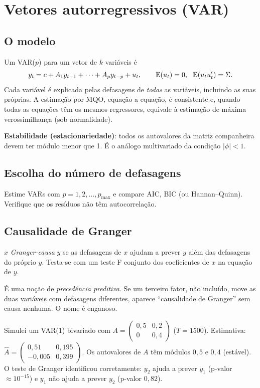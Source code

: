 \chapter{Vetores autorregressivos (VAR)}
\label{cap:var}

\section{O modelo}
Um VAR($p$) para um vetor de $k$ variáveis é
\[
y_t=c+A_1y_{t-1}+\dots+A_py_{t-p}+u_t,\qquad \mathbb{E}(u_t)=0,\ \ \mathbb{E}(u_tu_t')=\Sigma.
\]
Cada variável é explicada pelas defasagens de \emph{todas} as variáveis, incluindo as suas próprias. A estimação por MQO, equação a equação, é consistente e, quando todas as equações têm os mesmos regressores, equivale à estimação de máxima verossimilhança (sob normalidade).

\textbf{Estabilidade (estacionariedade)}: todos os autovalores da matriz companheira devem ter módulo menor que 1. É o análogo multivariado da condição $|\phi|<1$.

\section{Escolha do número de defasagens}
Estime VARs com $p=1,2,\dots,p_{\max}$ e compare AIC, BIC (ou Hannan--Quinn). Verifique que os resíduos não têm autocorrelação.

\section{Causalidade de Granger}
$x$ \emph{Granger-causa} $y$ se as defasagens de $x$ ajudam a prever $y$ além das defasagens do próprio $y$. Testa-se com um teste F conjunto dos coeficientes de $x$ na equação de $y$.

\begin{atencao}
É uma noção de \emph{precedência preditiva}. Se um terceiro fator, não incluído, move as duas variáveis com defasagens diferentes, aparece ``causalidade de Granger'' sem causa nenhuma. O nome é enganoso.
\end{atencao}

\begin{simulacao}
Simulei um VAR(1) bivariado com $A=\begin{pmatrix}0{,}5&0{,}2\\0&0{,}4\end{pmatrix}$ ($T=1500$). Estimativa: $\hat A=\begin{pmatrix}0{,}51&0{,}195\\-0{,}005&0{,}399\end{pmatrix}$. Os autovalores de $A$ têm módulos $0{,}5$ e $0{,}4$ (estável). O teste de Granger identificou corretamente: $y_2$ ajuda a prever $y_1$ (p-valor $\approx10^{-15}$) e $y_1$ não ajuda a prever $y_2$ (p-valor $0{,}82$).
\end{simulacao}

